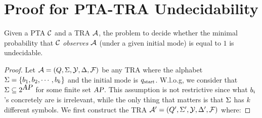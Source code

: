 \section{Proof for PTA-TRA Undecidability}\label{app:ptatraundecidability}

Given a PTA $\mathcal{C}$ and a TRA $\mathcal{A}$, the problem to decide whether the minimal probability
that $\mathcal{C}$ \emph{observes} $\mathcal{A}$ (under a given initial mode) is equal to $1$ is undecidable.
%
\begin{proof}
Let $\mathcal{A}=(Q,\Sigma,\mathcal{Y},\Delta,\mathcal{F})$ be any TRA where the alphabet $\Sigma = \{b_{1}, b_{2}, \cdots, b_{k}\}$ and the initial mode is $q_{\mbox{\sl\scriptsize start}}$.
W.l.o.g, we consider that $\Sigma\subseteq 2^{\mbox{\sl AP}}$ for some finite set $\mbox{\sl AP}$.
This assumption is not restrictive since what $b_{i}$'s concretely are is irrelevant, while the only thing that matters is that $\Sigma$ has $k$ different symbols.
We first construct the TRA $\mathcal{A}' = (Q', \Sigma', \mathcal{Y}, \Delta',\mathcal{F})$ where:


\end{proof}
